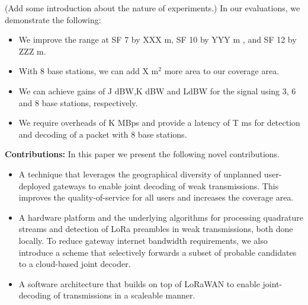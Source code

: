 
{\color{blue} (Add some introduction about the nature of experiments.)} In our evaluations, we demonstrate the following:
\begin{itemize}
    \item We improve the range at SF 7 by XXX m, SF 10 by YYY m , and SF 12 by
    ZZZ m.
    \item With 8 base stations, we can add X m$^2$ more area to our coverage area.
    \item We can achieve gains of J dBW,K dBW and LdBW for the signal using 3,
    6 and 8 base stations, respectively.
    \item We require overheads of K MBps and provide a latency of T ms for
    detection and decoding of a packet with 8 base stations.
\end{itemize}


\textbf{Contributions:} In this paper we present the following novel contributions.
\begin{itemize}
    \item A technique that leverages the geographical diversity of unplanned
    user-deployed gateways to enable joint decoding of weak transmissions.
    This improves the quality-of-service for all users and increases the
    coverage area.
    \item A hardware platform and the underlying algorithms for processing
    quadrature streams and detection of LoRa preambles in weak transmissions,
    both done locally. To reduce gateway internet bandwidth requirements, we
    also introduce a scheme that selectively forwards a subset of probable
    candidates to a cloud-based joint decoder.
    \item A software architecture that builds on top of LoRaWAN to enable
    joint-decoding of transmissions in a scaleable manner.
\end{itemize}